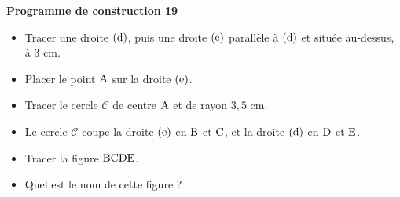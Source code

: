 \documentclass[exercice,a4]{thedocument}%
\begin{document}
%
\noindent\textbf{Programme de construction 19}\par\smallskip\noindent
\begin{itemize}
    \item Tracer une droite $(\text{d})$, puis une droite
    $(\text{e})$ parallèle à $(\text{d})$ et située au-dessus,
    à $3\text{ cm}$.
    \item Placer le point $\text{A}$ sur la droite $(\text{e})$.
    \item Tracer le cercle $\mathcal{C}$ de centre $\text{A}$ et de
    rayon $3{,}5\text{ cm}$.
    \item Le cercle $\mathcal{C}$ coupe la droite $(\text{e})$ en
    $\text{B}$ et $\text{C}$, et la droite
    $(\text{d})$ en $\text{D}$ et $\text{E}$.
    \item Tracer la figure $\text{BCDE}$.
    \item Quel est le nom de cette figure ?
\end{itemize}
\end{document}
